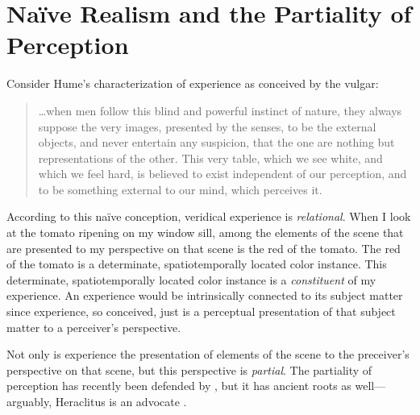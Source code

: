 \documentclass[12pt]{article}
\begin{document}

\section{Naïve Realism and the Partiality of Perception} %
\label{sec:naïve_realism_and_the_partiality_of_perception}

Consider Hume's characterization of experience as conceived by the vulgar:
\begin{quote}
    \ldots when men follow this blind and powerful instinct of nature, they always suppose the very images, presented by the senses, to be the external objects, and never entertain any suspicion, that the one are nothing but representations of the other. This very table, which we see white, and which we feel hard, is believed to exist independent of our perception, and to be something external to our mind, which perceives it. \citep[113--4]{Hume:1740lr}
\end{quote}
According to this naïve conception, veridical experience is \emph{relational}. When I look at the tomato ripening on my window sill, among the elements of the scene that are presented to my perspective on that scene is the red of the tomato. The red of the tomato is a determinate, spatiotemporally located color instance. This determinate, spatiotemporally located color instance is a \emph{constituent} of my experience. An experience would be intrinsically connected to its subject matter since experience, so conceived, just is a perceptual presentation of that subject matter to a perceiver's perspective.

Not only is experience the presentation of elements of the scene to the preceiver's perspective on that scene, but this perspective is \emph{partial}. The partiality of perception has recently been defended by \citet{Hilbert:1987jq}, but it has ancient roots as well---arguably, Heraclitus is an advocate \citep[see][]{Burnyeat:1979mv,Kalderon:2006tg}.
\end{document}
